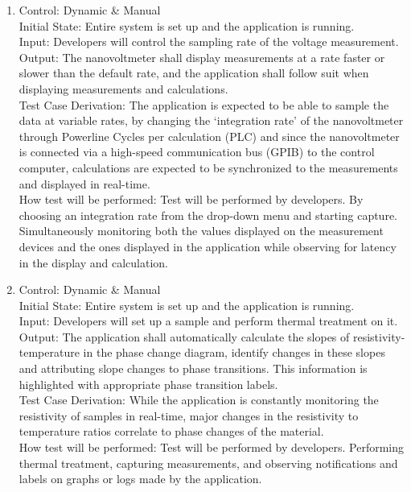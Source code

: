 \documentclass[12pt, titlepage]{article}
\begin{document}
\begin{enumerate}[{FR-T}1.]
    \item Control: Dynamic \& Manual\\
    Initial State: Entire system is set up and the application is running.\\
    Input: Developers will control the sampling rate of the voltage measurement.\\
    Output: The nanovoltmeter shall display measurements at a rate faster or slower than the default rate, and the application shall follow suit when displaying measurements and calculations.\\
    Test Case Derivation: The application is expected to be able to sample the data at variable rates, by changing the ‘integration rate’ of the nanovoltmeter through Powerline Cycles per calculation (PLC) and since the nanovoltmeter is connected via a high-speed communication bus (GPIB) to the control computer, calculations are expected to be synchronized to the measurements and displayed in real-time.\\
    How test will be performed: Test will be performed by developers. By choosing an integration rate from the drop-down menu and starting capture. Simultaneously monitoring both the values displayed on the measurement devices and the ones displayed in the application while observing for latency in the display and calculation.

    \item Control: Dynamic \& Manual\\
    Initial State: Entire system is set up and the application is running.\\
    Input: Developers will set up a sample and perform thermal treatment on it.\\
    Output: The application shall automatically calculate the slopes of resistivity-temperature in the phase change diagram, identify changes in these slopes and attributing slope changes to phase transitions. This information is highlighted with appropriate phase transition labels.\\
    Test Case Derivation: While the application is constantly monitoring the resistivity of samples in real-time, major changes in the resistivity to temperature ratios correlate to phase changes of the material.\\
How test will be performed: Test will be performed by developers. Performing thermal treatment, capturing measurements, and observing notifications and labels on graphs or logs made by the application.


\end{enumerate}
\end{document}
